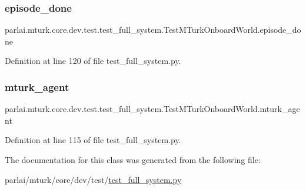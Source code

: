 \subsubsection{\texorpdfstring{episode\+\_\+done}{episode\_done}}
{\footnotesize\ttfamily parlai.\+mturk.\+core.\+dev.\+test.\+test\+\_\+full\+\_\+system.\+Test\+M\+Turk\+Onboard\+World.\+episode\+\_\+done}



Definition at line 120 of file test\+\_\+full\+\_\+system.\+py.

\mbox{\label{classparlai_1_1mturk_1_1core_1_1dev_1_1test_1_1test__full__system_1_1TestMTurkOnboardWorld_a57ab0490a71d0e7df3aeaf7d9d162dc9}} 
\subsubsection{\texorpdfstring{mturk\+\_\+agent}{mturk\_agent}}
{\footnotesize\ttfamily parlai.\+mturk.\+core.\+dev.\+test.\+test\+\_\+full\+\_\+system.\+Test\+M\+Turk\+Onboard\+World.\+mturk\+\_\+agent}



Definition at line 115 of file test\+\_\+full\+\_\+system.\+py.



The documentation for this class was generated from the following file\+:\begin{DoxyCompactItemize}
\item 
parlai/mturk/core/dev/test/\hyperlink{dev_2test_2test__full__system_8py}{test\+\_\+full\+\_\+system.\+py}\end{DoxyCompactItemize}
